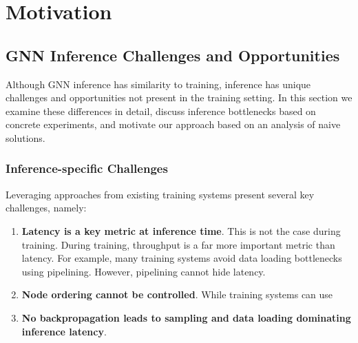 \chapter{Motivation}

\section{GNN Inference Challenges and Opportunities}
Although GNN inference has similarity to training, inference has unique challenges and opportunities not present in the training setting. 
In this section we examine these differences in detail, discuss inference bottlenecks based on concrete experiments, and motivate our approach based on an analysis of naive solutions.

\subsection{Inference-specific Challenges}
Leveraging approaches from existing training systems present several key challenges, namely:

\begin{enumerate}
    \item \textbf{Latency is a key metric at inference time}. This is not the case during training. During training, throughput is a far more important metric than latency. For example, many training systems avoid data loading bottlenecks using pipelining. However, pipelining cannot hide latency.
    \item \textbf{Node ordering cannot be controlled}. While training systems can use 
    \item \textbf{No backpropagation leads to sampling and data loading dominating inference latency}. 
\end{enumerate}

